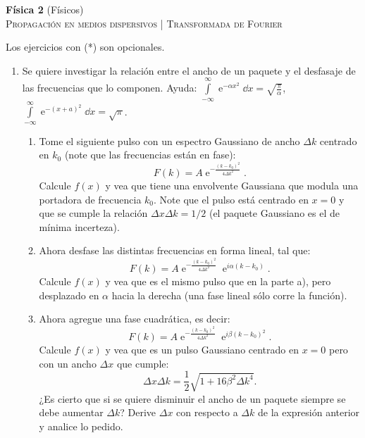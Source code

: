 \documentclass[11pt,spanish,a4paper]{article}
\begin{document}
\begin{center}
\textbf{Física 2} (Físicos) \hfill {}\\
	\textsc{\LARGE Propagación en medios dispersivos | Transformada de Fourier}
\end{center}

Los ejercicios con (*) son opcionales.

\begin{enumerate}

								
\section*{Transformada de Fourier}

\item Se quiere investigar la relación entre el ancho de un paquete y el desfasaje de las frecuencias que lo componen.
Ayuda: \( \int\limits_{-\infty}^{\infty} \operatorname{e}^{-\alpha x^2} \dd{x} = \sqrt{\frac{\pi}{\alpha} } \), \( \int\limits_{-\infty}^{\infty} \operatorname{e}^{-(x+ a)^2} \dd{x} = \sqrt{\pi}\).
\begin{enumerate}
	\item Tome el siguiente pulso con un espectro Gaussiano de ancho $\Delta k$ centrado en $k_0$ (note que las frecuencias están en fase):
$$
F(k)=A \operatorname{e}^{-\frac{ ( k - k_0 )^2 }{ 4 \Delta k^2 } }.
$$
Calcule $f(x)$ y vea que tiene una envolvente Gaussiana que modula una portadora de frecuencia $k_{0}$.
Note que el pulso está centrado en $x=0$ y que se cumple la relación $\Delta x \Delta k = 1/2$ (el paquete Gaussiano es el de mínima incerteza).
	\item Ahora desfase las distintas frecuencias en forma lineal, tal que:
$$
F(k)=A \operatorname{e}^{ -\frac{ ( k - k_0 )^2 }{ 4 \Delta k^2 } } \operatorname{e}^{ i \alpha (k - k_0 ) }.
$$
Calcule $f(x)$ y vea que es el mismo pulso que en la parte a), pero desplazado en $\alpha$ hacia la derecha (una fase lineal sólo corre la función).
	\item Ahora agregue una fase cuadrática, es decir:
$$
F(k) = A \operatorname{e}^{-\frac{(k-k_{0})^{2}}{4\Delta k^{2}} } \operatorname{e}^{i \beta ( k - k_0 )^2 }.
$$
Calcule $f(x)$ y vea que es un pulso Gaussiano centrado en $x=0$ pero con un ancho $\Delta x$ que cumple:
$$
\Delta x \Delta k = \frac{1}{2} \sqrt{ 1 + 16 \beta^2 \Delta k^4 }.
$$
¿Es cierto que si se quiere disminuir el ancho de un paquete siempre se debe aumentar $\Delta k$?
Derive $\Delta x$ con respecto a $\Delta k$ de la expresión anterior y analice lo pedido.
\end{enumerate}




\end{enumerate}
\end{document}
